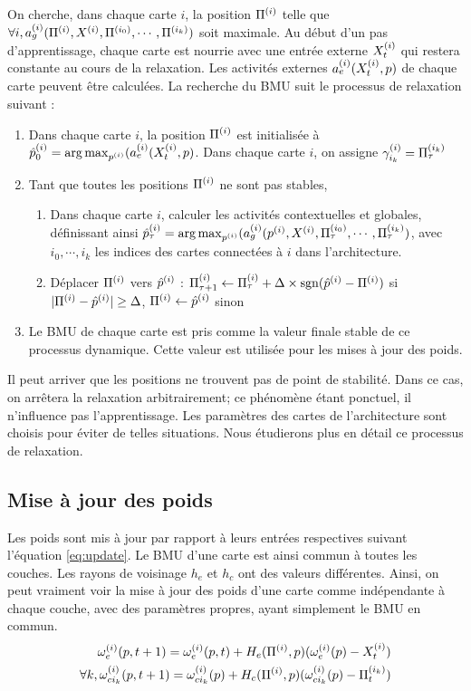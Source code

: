 On cherche, dans chaque carte $i$, la position $\Pi^{({i})}$ telle que $\forall i, a_g^{({i})}(\Pi^{({i})},X^{({i})},\Pi^{({i_0})},\cdots,\Pi^{({i_k})})$ soit maximale.
Au début d'un pas d'apprentissage, chaque carte est nourrie avec une entrée externe $X^{({i})}_t$ qui restera constante au cours de la relaxation. Les activités externes $a_e^{({i})}(X^{({i})}_t,p)$ de chaque carte peuvent être calculées.
La recherche du BMU suit le processus de relaxation suivant :
\begin{enumerate}
\item Dans chaque carte $i$, la position $\Pi^{({i})}$ est initialisée à $\hat{p}^{({i})}_0 = \operatorname*{arg\,max}_{p^{({i})}}(a_e^{({i})}(X^{({i})}_t,p)$. Dans chaque carte $i$, on assigne $\gamma_{i_k}^{({i})} = \Pi^{({i_k})}_\tau$
\item Tant que toutes les positions $\Pi^{({i})}$ ne sont pas stables, 
	\begin{enumerate}
	\item Dans chaque carte $i$, calculer les activités contextuelles et globales, définissant ainsi $\hat{p}^{({i})}_\tau = \operatorname*{arg\,max}_{p^{({i})}}(a_g^{({i})}(p^{({i})},X^{({i})}, \Pi^{({i_0})}_\tau,\cdots,\Pi^{({i_k})}_\tau)$, avec $i_0, \cdots, i_k$ les indices des cartes connectées à $i$ dans l'architecture.
	\item Déplacer $\Pi^{({i})}$ vers $\hat{p}^{({i})}$ : $\Pi^{({i})}_{\tau +1} \leftarrow \Pi^{({i})}_\tau + \Delta \times \operatorname{sgn}(\hat{p}^{({i})} - \Pi^{({i})})$ si $\lvert \Pi^{({i})}- \hat{p}^{({i})}\rvert \geq \Delta$, $\Pi^{({i})} \leftarrow \hat{p}^{({i})}$ sinon
	\end{enumerate}
\item Le BMU de chaque carte est pris comme la valeur finale stable de ce processus dynamique. Cette valeur est utilisée pour les mises à jour des poids.
\end{enumerate}

Il peut arriver que les positions ne trouvent pas de point de stabilité. Dans ce cas, on arrêtera la relaxation arbitrairement; ce phénomène étant ponctuel, il n'influence pas l'apprentissage. Les paramètres des cartes de l'architecture sont choisis pour éviter de telles situations.
Nous étudierons plus en détail ce processus de relaxation.

\subsection{Mise à jour des poids}
Les poids sont mis à jour par rapport à leurs entrées respectives suivant l'équation \ref{eq:update}. Le BMU d'une carte est ainsi commun à toutes les couches. 
Les rayons de voisinage $h_e$ et $h_c$ ont des valeurs différentes.
Ainsi, on peut vraiment voir la mise à jour des poids d'une carte comme indépendante à chaque couche, avec des paramètres propres, ayant simplement le BMU en commun.
\begin{align}
 \omega_{e}^{({i})}(p,t+1) = \omega_{e}^{({i})}(p,t) + H_{e}(\Pi^{({i})}, p)(\omega_{e}^{({i})}(p) - X_t^{({i})}) \\
\forall k, \omega_{ci_k}^{({i})}(p,t+1) = \omega_{ci_k}^{({i})}(p) + H_{c}(\Pi^{({i})},p)(\omega_{ci_k}^{({i})}(p) - \Pi^{({i_k})}_t)
\end{align}


